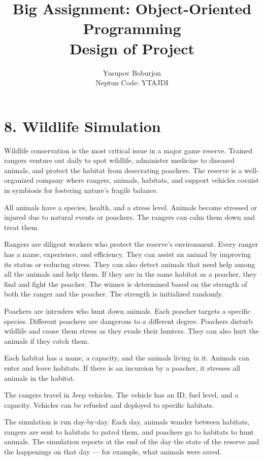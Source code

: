 \documentclass[a4paper,12pt]{article}
\title{Big Assignment: Object-Oriented Programming\\\large Design of Project}
\author{Yusupov Boburjon\\Neptun Code: YTAJDI}
\date{}
\begin{document}
\maketitle

\newpage

\section*{8. Wildlife Simulation}

Wildlife conservation is the most critical issue in a major game reserve.  
Trained rangers venture out daily to spot wildlife, administer medicine to diseased animals, and protect the habitat from desecrating poachers. The reserve is a well-organized company where rangers, animals, habitats, and support vehicles coexist in symbiosis for fostering nature’s fragile balance.

All animals have a species, health, and a stress level. Animals become stressed or injured due to natural events or poachers. The rangers can calm them down and treat them.

Rangers are diligent workers who protect the reserve’s environment. Every ranger has a name, experience, and efficiency. They can assist an animal by improving its status or reducing stress. They can also detect animals that need help among all the animals and help them. If they are in the same habitat as a poacher, they find and fight the poacher. The winner is determined based on the strength of both the ranger and the poacher. The strength is initialized randomly.

Poachers are intruders who hunt down animals. Each poacher targets a specific species. Different poachers are dangerous to a different degree. Poachers disturb wildlife and cause them stress as they evade their hunters. They can also hurt the animals if they catch them.

Each habitat has a name, a capacity, and the animals living in it. Animals can enter and leave habitats. If there is an incursion by a poacher, it stresses all animals in the habitat.

The rangers travel in Jeep vehicles. The vehicle has an ID, fuel level, and a capacity. Vehicles can be refueled and deployed to specific habitats.

The simulation is run day-by-day. Each day, animals wander between habitats, rangers are sent to habitats to patrol them, and poachers go to habitats to hunt animals. The simulation reports at the end of the day the state of the reserve and the happenings on that day — for example, what animals were saved.
\end{document}
